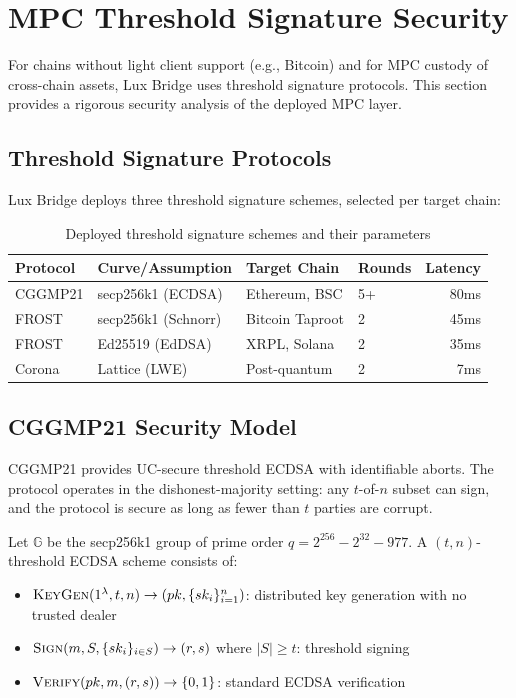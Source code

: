 \section{MPC Threshold Signature Security}
\label{sec:mpc-security}

For chains without light client support (e.g., Bitcoin) and for MPC custody of cross-chain assets, Lux Bridge uses threshold signature protocols. This section provides a rigorous security analysis of the deployed MPC layer.

\subsection{Threshold Signature Protocols}

Lux Bridge deploys three threshold signature schemes, selected per target chain:

\begin{table}[h]
\centering
\begin{tabular}{llllr}
\toprule
\textbf{Protocol} & \textbf{Curve/Assumption} & \textbf{Target Chain} & \textbf{Rounds} & \textbf{Latency} \\
\midrule
CGGMP21 \cite{cgg21} & secp256k1 (ECDSA) & Ethereum, BSC & 5+ & 80ms \\
FROST \cite{frost} & secp256k1 (Schnorr) & Bitcoin Taproot & 2 & 45ms \\
FROST \cite{frost} & Ed25519 (EdDSA) & XRPL, Solana & 2 & 35ms \\
Corona \cite{corona} & Lattice (LWE) & Post-quantum & 2 & 7ms \\
\bottomrule
\end{tabular}
\caption{Deployed threshold signature schemes and their parameters}
\label{tab:threshold-schemes}
\end{table}

\subsection{CGGMP21 Security Model}

CGGMP21 \cite{cgg21} provides UC-secure threshold ECDSA with identifiable aborts. The protocol operates in the dishonest-majority setting: any $t$-of-$n$ subset can sign, and the protocol is secure as long as fewer than $t$ parties are corrupt.

\begin{definition}
Let $\mathbb{G}$ be the secp256k1 group of prime order $q = 2^{256} - 2^{32} - 977$. A $(t, n)$-threshold ECDSA scheme consists of:
\begin{itemize}
  \item $\textsc{KeyGen}(1^\lambda, t, n) \to (pk, \{sk_i\}_{i=1}^n)$: distributed key generation with no trusted dealer
  \item $\textsc{Sign}(m, S, \{sk_i\}_{i \in S}) \to (r, s)$ where $|S| \geq t$: threshold signing
  \item $\textsc{Verify}(pk, m, (r,s)) \to \{0,1\}$: standard ECDSA verification
\end{itemize}
\end{definition}

